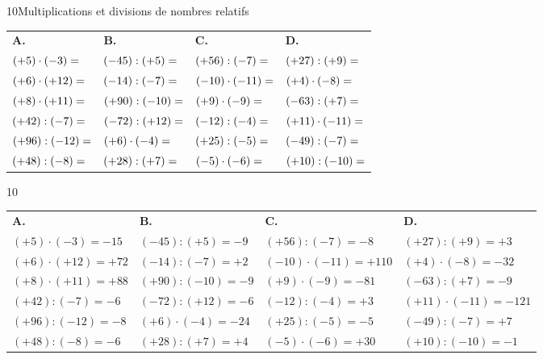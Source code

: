 \begin{exercice}{10}{Multiplications et divisions de nombres relatifs}
{\small
\bigskip
\def\arraystretch{1.7}
\begin{tabularx}{\linewidth}{*{4}{X}}
\textbf{A.} & \textbf{B.} & \textbf{C.} & \textbf{D.} \\
$(+5)\cdot(-3)= \dotfill$    & $(-45):(+5)= \dotfill$  & $(+56):(-7)= \dotfill$      & $(+27):(+9)= \dotfill$      \\
$(+6)\cdot(+12)= \dotfill$   & $(-14):(-7)= \dotfill$  & $(-10)\cdot(-11)= \dotfill$ & $(+4)\cdot(-8)= \dotfill$   \\
$(+8)\cdot(+11)= \dotfill$   & $(+90):(-10)= \dotfill$ & $(+9)\cdot(-9)= \dotfill$   & $(-63):(+7)= \dotfill$      \\
$(+42):(-7)= \dotfill$       & $(-72):(+12)= \dotfill$ & $(-12):(-4)= \dotfill$      & $(+11)\cdot(-11)= \dotfill$ \\
$(+96):(-12)= \dotfill$      & $(+6)\cdot(-4)= \dotfill$ & $(+25):(-5)= \dotfill$    & $(-49):(-7)= \dotfill$      \\
$(+48):(-8)= \dotfill$       & $(+28):(+7)= \dotfill$  & $(-5)\cdot(-6)= \dotfill$   & $(+10):(-10)= \dotfill$     \\
\end{tabularx}
}
\end{exercice}
\begin{solution}{10}

\def\arraystretch{1.7}
\begin{tabularx}{\linewidth}{*{4}{X}}
\textbf{A.} & \textbf{B.} & \textbf{C.} & \textbf{D.} \\
$(+5)\cdot(-3)=-15$    & $(-45):(+5)=-9$   & $(+56):(-7)=-8$       & $(+27):(+9)=+3$      \\
$(+6)\cdot(+12)=+72$   & $(-14):(-7)=+2$   & $(-10)\cdot(-11)=+110$& $(+4)\cdot(-8)=-32$  \\
$(+8)\cdot(+11)=+88$   & $(+90):(-10)=-9$  & $(+9)\cdot(-9)=-81$   & $(-63):(+7)=-9$      \\
$(+42):(-7)=-6$        & $(-72):(+12)=-6$  & $(-12):(-4)=+3$       & $(+11)\cdot(-11)=-121$\\
$(+96):(-12)=-8$       & $(+6)\cdot(-4)=-24$ & $(+25):(-5)=-5$     & $(-49):(-7)=+7$      \\
$(+48):(-8)=-6$        & $(+28):(+7)=+4$   & $(-5)\cdot(-6)=+30$   & $(+10):(-10)=-1$     \\
\end{tabularx}

\end{solution}

